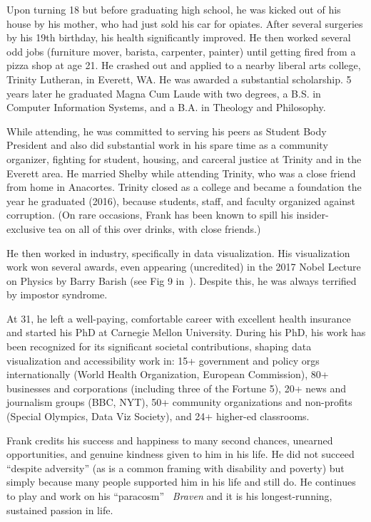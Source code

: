 \documentclass[12pt]{cmuthesis}
\begin{document}
Upon turning 18 but before graduating high school, he was kicked out of his house by his mother, who had just sold his car for opiates. After several surgeries by his 19th birthday, his health significantly improved. He then worked several odd jobs (furniture mover, barista, carpenter, painter) until getting fired from a pizza shop at age 21. He crashed out and applied to a nearby liberal arts college, Trinity Lutheran, in Everett, WA. He was awarded a substantial scholarship. 5 years later he graduated Magna Cum Laude with two degrees, a B.S. in Computer Information Systems, and a B.A. in Theology and Philosophy.

While attending, he was committed to serving his peers as Student Body President and also did substantial work in his spare time as a community organizer, fighting for student, housing, and carceral justice at Trinity and in the Everett area. He married Shelby while attending Trinity, who was a close friend from home in Anacortes. Trinity closed as a college and became a foundation the year he graduated (2016), because students, staff, and faculty organized against corruption. (On rare occasions, Frank has been known to spill his insider-exclusive tea on all of this over drinks, with close friends.)

He then worked in industry, specifically in data visualization. His visualization work won several awards, even appearing (uncredited) in the 2017 Nobel Lecture on Physics by Barry Barish (see Fig 9 in~\cite{Barish2018}). Despite this, he was always terrified by impostor syndrome.

At 31, he left a well-paying, comfortable career with excellent health insurance and started his PhD at Carnegie Mellon University. During his PhD, his work has been recognized for its significant societal contributions, shaping data visualization and accessibility work in: 15+ government and policy orgs internationally (World Health Organization, European Commission), 80+ businesses and corporations (including three of the Fortune 5), 20+ news and journalism groups (BBC, NYT), 50+ community organizations and non-profits (Special Olympics, Data Viz Society), and 24+ higher-ed classrooms.

Frank credits his success and happiness to many second chances, unearned opportunities, and genuine kindness given to him in his life. He did not succeed ``despite adversity'' (as is a common framing with disability and poverty) but simply because many people supported him in his life and still do. He continues to play and work on his ``paracosm''~\cite{RootBernstein2006,Alexander2012} \textit{Braven} and it is his longest-running, sustained passion in life.
\end{document}
